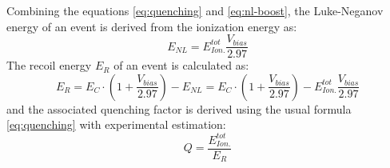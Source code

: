Combining the equations \ref{eq:quenching} and \ref{eq:nl-boost}, the Luke-Neganov energy of an event is derived from the ionization energy as:
\begin{equation}
\label{eq:luke-neganov-energy}
E_{NL} = E_{Ion.}^{tot} \frac{V_{bias}}{2.97}
\end{equation}
The recoil energy $E_R$ of an event is calculated as:
\begin{equation}
E_R = E_C \cdot \left( 1 + \frac{V_{bias}}{2.97} \right) - E_{NL}
= E_C \cdot \left( 1 + \frac{V_{bias}}{2.97} \right) - E_{Ion.}^{tot} \frac{V_{bias}}{2.97}
\end{equation}
and the associated quenching factor is derived using the usual formula \ref{eq:quenching} with experimental estimation:
\begin{equation}
Q = \frac{E_{Ion.}^{tot}}{E_R}
\end{equation}


